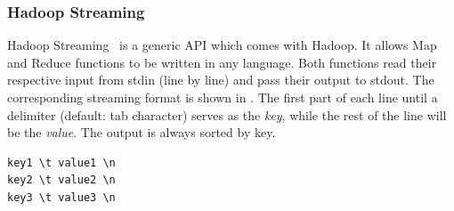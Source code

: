 \subsubsection{Hadoop Streaming}
Hadoop Streaming~\cite{HadoopStreaming} is a generic API which comes with Hadoop. It allows Map and Reduce functions to be written in any language. Both functions read their respective input from stdin (line by line) and pass their output to stdout. The corresponding streaming format is shown in . The first part of each line until a delimiter (default: tab character) serves as the \emph{key}, while the rest of the line will be the \emph{value}. The output is always sorted by key.

\begin{lstlisting}[breaklines=true, caption=Default Hadoop Streaming format., escapechar=|, label={lst:streaming}]
key1 \t value1 \n
key2 \t value2 \n
key3 \t value3 \n
\end{lstlisting}
